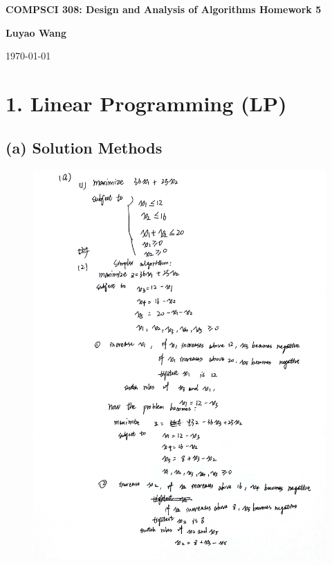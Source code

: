 \documentclass[10pt]{article}
\begin{document}

\begin{center}
  {\Large \bf COMPSCI 308: Design and Analysis of Algorithms Homework 5}
  \vspace{2mm}

  {\bf Luyao Wang}

  {\today}
\end{center}

\section*{1. Linear Programming (LP)}

\subsection*{(a) Solution Methods}

\begin{figure}[H]
  \centering
  \includegraphics[width=\linewidth]{../assets/1.jpg}
\end{figure}
\end{document}
